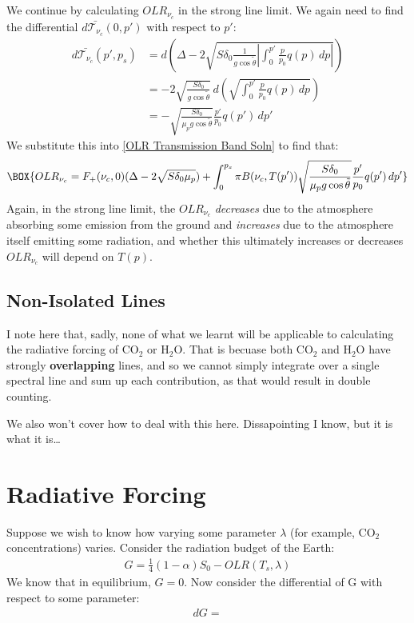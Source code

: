 We continue by calculating $OLR_{\nu_c}$ in the strong line limit. We again need to find the differential $d\bar{\mathcal{T}_{\nu_c}}(0,p')$ with respect to $p'$:
\begin{align*}
    d\bar{\mathcal{T}_{\nu_c}}(p',p_s)&=d\left( 
        \Delta - 2\sqrt{S\delta_0\frac{1}{g\cos\tilde{\theta}}\left|
            \int_{0}^{p'}\frac{p}{p_0}q(p)\,dp
        \right|}
     \right)\\
     &= -2\sqrt{\frac{S\delta_0}{g\cos\tilde{\theta}}}\,d\left( 
        \sqrt{\int_{0}^{p'}\frac{p}{p_0}q(p)\,dp}
      \right)
     \\
     &= -\sqrt{\frac{S\delta_0}{\mu_pg\cos\tilde{\theta}}}\frac{p'}{p_0}q(p')\,dp'
\end{align*}
We substitute this into \ref{OLR Transmission Band Soln} to find that:
\begin{align}
    \BOX{OLR_{\nu_c}
    =F_+(\nu_c,0)(\Delta-2\sqrt{S\delta_0 \mu_p})+\int_{0}^{p_s}\pi B(\nu_c,T(p'))\sqrt{\frac{S\delta_0}{\mu_pg\cos\tilde{\theta}}}\frac{p'}{p_0}q(p')\,dp'}
\end{align}
Again, in the strong line limit, the $OLR_{\nu_c}$ \textit{decreases} due to the atmosphere absorbing some emission from the ground and \textit{increases} due to the atmosphere itself emitting some radiation, and whether this ultimately increases or decreases $OLR_{\nu_c}$ will depend on $T(p)$.

\subsection{Non-Isolated Lines}

I note here that, sadly, none of what we learnt will be applicable to calculating the radiative forcing of CO$_2$ or H$_2$O. That is becuase both CO$_2$ and H$_2$O have strongly \textbf{overlapping} lines, and so we cannot simply integrate over a single spectral line and sum up each contribution, as that would result in double counting.

We also won't cover how to deal with this here. Dissapointing I know, but it is what it is\ldots

\section{Radiative Forcing}

Suppose we wish to know how varying some parameter $\lambda$ (for example, CO$_2$ concentrations) varies. Consider the radiation budget of the Earth:
\begin{align}
    G=\frac{1}{4}(1-\alpha)S_0-OLR(T_s,\lambda)
\end{align}
We know that in equilibrium, $G=0$. Now consider the differential of G with respect to some parameter:
\begin{align*}
    dG = 
\end{align*}

